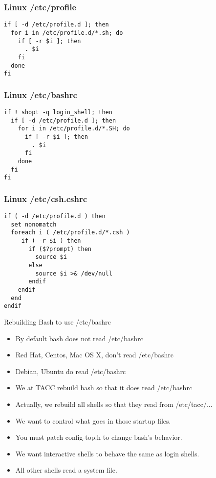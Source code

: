 \documentclass{beamer}
\begin{document}
\begin{frame}[fragile]
    \frametitle{Linux /etc/profile}
    {
\begin{verbatim}
if [ -d /etc/profile.d ]; then
  for i in /etc/profile.d/*.sh; do
    if [ -r $i ]; then
      . $i
    fi
  done
fi
\end{verbatim}
    }
\end{frame}


\begin{frame}[fragile]
    \frametitle{Linux /etc/bashrc}
    {
\begin{verbatim}
if ! shopt -q login_shell; then
  if [ -d /etc/profile.d ]; then
    for i in /etc/profile.d/*.SH; do
      if [ -r $i ]; then
        . $i
      fi
    done
  fi
fi
\end{verbatim}
    }
\end{frame}

\begin{frame}[fragile]
    \frametitle{Linux /etc/csh.cshrc}
    {
\begin{verbatim}
if ( -d /etc/profile.d ) then
  set nonomatch
  foreach i ( /etc/profile.d/*.csh )
     if ( -r $i ) then
       if ($?prompt) then
         source $i
       else
         source $i >& /dev/null
       endif
    endif
  end
endif
\end{verbatim}
    }
\end{frame}

\begin{frame}{Rebuilding Bash to use /etc/bashrc}
  \begin{itemize}
    \item By default bash does not read /etc/bashrc
    \item Red Hat, Centos,  Mac OS X, don't read /etc/bashrc
    \item Debian, Ubuntu do read /etc/bashrc
    \item We at TACC rebuild bash so that it does read /etc/bashrc
    \item Actually, we rebuild all shells so that they read from /etc/tacc/...
    \item We want to control what goes in those startup files.
    \item You must patch config-top.h to change bash's behavior.
    \item We want interactive shells to behave the same as login shells.
    \item All other shells read a system file.
  \end{itemize}
\end{frame}
\end{document}
